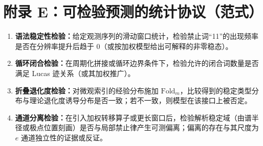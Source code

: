 \section{附录 E：可检验预测的统计协议（范式）}

\begin{enumerate}
  \item \textbf{语法稳定性检验：}给定观测序列的滑动窗口统计，检验禁止词“11”的出现频率是否在分辨率提升后趋于 $0$（或按加权模型给出可解释的非零稳态）。
  \item \textbf{循环闭合检验：}在周期化拼接或循环边界条件下，检验允许的闭合词数量是否满足 Lucas 迹关系（或其加权推广）。
  \item \textbf{折叠退化度检验：}对微观索引的经验分布施加 $\mathrm{Fold}_m$，比较得到的稳定类型分布与理论退化度诱导分布是否一致；若不一致，则模型在该接口上被否定。
  \item \textbf{通道分离检验：}在引入加权转移算子或更长窗口后，检验解析稳定域（由谱半径或极点位置刻画）是否与局部禁止律产生可测偏离；偏离的存在与其尺度为 $e$ 通道独立性的证据或反证。
\end{enumerate}

